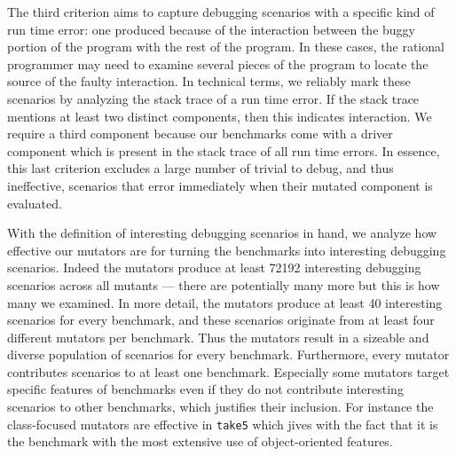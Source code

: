 The third criterion aims to capture debugging scenarios with a specific
kind of run time error: one produced because of the interaction between the buggy
portion of the program with the rest of the program.  In these cases, the rational programmer
may need to examine several pieces of the program to locate the source of the faulty interaction.
In technical terms, we reliably mark these scenarios by
analyzing the stack trace of a run time error.  If the stack trace mentions at
least two distinct components, then this indicates interaction.  We require a third component because our benchmarks come
with a driver component which is present in the stack trace of all run
time errors. In essence, this last criterion excludes a large number of
trivial to debug, and thus ineffective, scenarios that error immediately when their mutated component is
evaluated. 




With the definition of interesting debugging scenarios in hand, we analyze how effective our mutators
are for turning the benchmarks into interesting debugging scenarios.
Indeed the mutators produce at least 72192 interesting debugging scenarios
across all mutants --- there are potentially many more but this is how
many we examined. In more detail, the mutators produce at least 40 interesting
scenarios for every benchmark, and these scenarios originate from at
least four different mutators per benchmark.  Thus the mutators result in 
a sizeable and diverse population of scenarios for every benchmark.
Furthermore, every mutator contributes scenarios to at least one
benchmark. Especially some mutators  target specific features of
benchmarks even if they do not contribute interesting scenarios to other
benchmarks, which
justifies their inclusion. For
instance the class-focused mutators are effective in \texttt{take5}
which jives with the fact that it is the benchmark with 
the most extensive use of object-oriented features.
